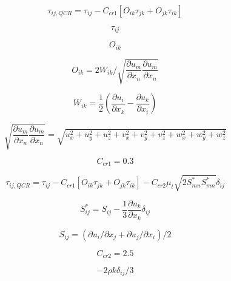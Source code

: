 

\begin{equation}
\tau_{ij,QCR} = \tau_{ij} - C_{cr1} \left[ O_{ik} \tau_{jk} + O_{jk} \tau_{ik} \right]
\end{equation}

\begin{equation}
\tau_{ij}
\end{equation}

\begin{equation}
O_{ik}
\end{equation}

\begin{equation}
O_{ik} = 2W_{ik} / \sqrt{\frac{\partial u_m}{\partial x_n}\frac{\partial u_m}{\partial x_n}}
\end{equation}

\begin{equation}
W_{ik} = \frac{1}{2} \left( \frac{\partial u_i}{\partial x_k} - \frac{\partial u_k}{\partial x_i} \right)
\end{equation}

\begin{equation}
\sqrt{\frac{\partial u_m}{\partial x_n}\frac{\partial u_m}{\partial x_n}} =
\sqrt{u_x^2 + u_y^2 + u_z^2 + v_x^2 + v_y^2 + v_z^2 + w_x^2 + w_y^2 + w_z^2}
\end{equation}

\begin{equation}
C_{cr1} = 0.3
\end{equation}

\begin{equation}
\tau_{ij,QCR} = \tau_{ij} - C_{cr1} \left[ O_{ik} \tau_{jk} + O_{jk} \tau_{ik} \right]
- C_{cr2} \mu_t \sqrt{2 S^*_{mn}S^*_{mn}}\delta_{ij}
\end{equation}

\begin{equation}
S^*_{ij} = S_{ij} - \frac{1}{3} \frac{\partial u_k}{\partial x_k} \delta_{ij}
\end{equation}

\begin{equation}
S_{ij} = (\partial u_i / \partial x_j + \partial u_j / \partial x_i)/2
\end{equation}

\begin{equation}
C_{cr2} = 2.5
\end{equation}

\begin{equation}
-2 \rho k \delta_{ij}/3
\end{equation}

